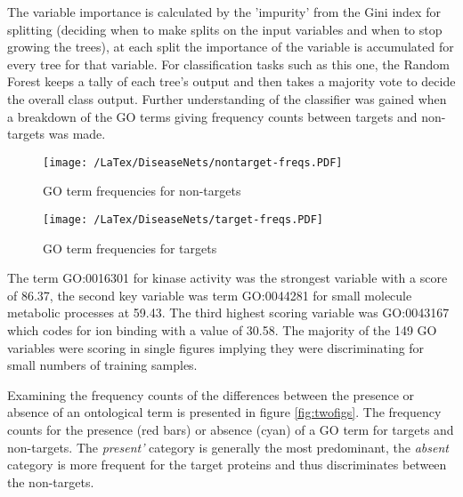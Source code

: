 \documentclass[a4paper,8pt,twocolumn,5p]{elsarticle}
\begin{document}
The variable importance is calculated by the 'impurity' from the Gini index for splitting (deciding when to make splits on the input variables and when to stop growing the trees), at each split the importance of the variable is accumulated for every tree for that variable. For classification tasks such as this one, the Random Forest keeps a tally of each tree's output and then takes a majority vote to decide the overall class output. Further understanding of the classifier was gained when a breakdown of the GO terms giving frequency counts between targets and non-targets was made. 
\begin{figure*}[h]
\centering
   \begin{subfigure}{0.5\linewidth} \centering
    \texttt{[image: /LaTex/DiseaseNets/nontarget-freqs.PDF]}
     \caption{GO term frequencies for non-targets}\label{fig:fig1}
   \end{subfigure}
   \begin{subfigure}{0.4\linewidth} \centering
   \texttt{[image: /LaTex/DiseaseNets/target-freqs.PDF]}
     \caption{GO term frequencies for targets}\label{fig:fig2}
   \end{subfigure}
\caption{The frequency counts for the presence (red bars) or absence (cyan) of a GO term for targets and non-targets. The y-axis is broken to highlight the differences between them. The {\it present'} category is generally the most predominant. The {\it absent} category is more frequent for the target proteins and thus discriminates between the non-targets} \label{fig:twofigs}
\end{figure*}

The term GO:0016301 for kinase activity was the strongest variable with a score of 86.37,  the second key variable was term GO:0044281 for small molecule metabolic processes at 59.43. The third highest scoring variable was GO:0043167 which codes for ion binding with a value of 30.58. The majority of the 149 GO variables were scoring in single figures implying they were discriminating for small numbers of training samples.

Examining the frequency counts of the differences between the presence or absence of an ontological term is presented in figure \ref{fig:twofigs}. The frequency counts for the presence (red bars) or absence (cyan) of a GO term for targets and non-targets.  The {\it present'} category is generally the most predominant, the {\it absent} category is more frequent for the target proteins and thus discriminates between the non-targets. 
\end{document}
